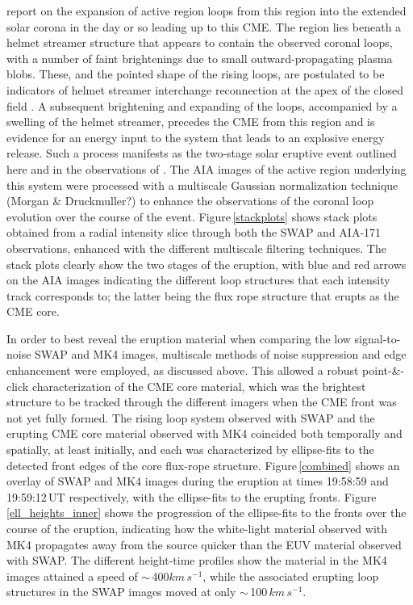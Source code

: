 \documentclass[namedreferences]{solarphysics}
\begin{document}
\begin{article}
 report on the expansion of active region loops from this region into the extended solar corona in the day or so leading up to this CME. The region lies beneath a helmet streamer structure that appears to contain the observed coronal loops, with a number of faint brightenings due to small outward-propagating plasma blobs. These, and the pointed shape of the rising loops, are postulated to be indicators of helmet streamer interchange reconnection at the apex of the closed field \cite{2012ApJ...749..182W}. A subsequent brightening and expanding of the loops, accompanied by a swelling of the helmet streamer, precedes the CME from this region and is evidence for an energy input to the system that leads to an explosive energy release. Such a process manifests as the two-stage solar eruptive event outlined here and in the observations of . The AIA images of the active region underlying this system were processed with a multiscale Gaussian normalization technique \cite{}(Morgan \& Druckmuller?) to enhance the observations of the coronal loop evolution over the course of the event. Figure\,\ref{stackplots} shows stack plots obtained from a radial intensity slice through both the SWAP and AIA-171 observations, enhanced with the different multiscale filtering techniques. The stack plots clearly show the two stages of the eruption, with blue and red arrows on the AIA images indicating the different loop structures that each intensity track corresponds to; the latter being the flux rope structure that erupts as the CME core.

In order to best reveal the eruption material when comparing the low signal-to-noise SWAP and MK4 images, multiscale methods of noise suppression and edge enhancement were employed, as discussed above. This allowed a robust point-\&-click characterization of the CME core material, which was the brightest structure to be tracked through the different imagers when the CME front was not yet fully formed. The rising loop system observed with SWAP and the erupting CME core material observed with MK4 coincided both temporally and spatially, at least initially, and each was characterized by ellipse-fits to the detected front edges of the core flux-rope structure. Figure\,\ref{combined} shows an overlay of SWAP and MK4 images during the eruption at times 19:58:59 and 19:59:12\,UT respectively, with the ellipse-fits to the erupting fronts. Figure\,\ref{ell_heights_inner} shows the progression of the ellipse-fits to the fronts over the course of the eruption, indicating how the white-light material observed with MK4 propagates away from the source quicker than the EUV material observed with SWAP. The different height-time profiles show the material in the MK4 images attained a speed of $\sim$\,400$km\,s^{-1}$, while the associated erupting loop structures in the SWAP images moved at only $\sim$\,100$\,km\,s^{-1}$. %



\end{article}
\end{document}
